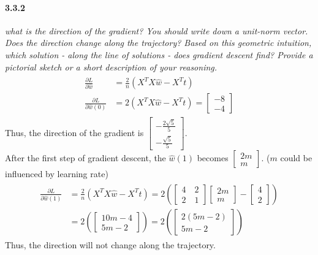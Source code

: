 \documentclass{myhw}
\begin{document}
\begin{homeworkProblem}
\begin{homeworkSection}
\paragraph{3.3.2} \emph{what is the direction of the gradient? You should write down a unit-norm vector. Does the direction change along the trajectory? Based on this geometric intuition, which solution - along the line of solutions - does gradient descent find? Provide a pictorial sketch or a short description of your reasoning. } 
\begin{gather*}
\begin{aligned}
\frac{\partial L}{\partial \hat{w}} &= \frac{2}{n} (X^TX\hat{w} - X^Tt) \\
\frac{\partial L}{\partial \hat{w}(0)} &= 2 (X^TX\hat{w} - X^Tt) = \begin{bmatrix} -8 \\ -4 \end{bmatrix}
\end{aligned}
\end{gather*}
Thus, the direction of the gradient is 
$\begin{bmatrix} -\frac{2\sqrt{5}}{5} \\ -\frac{\sqrt{5}}{5} \end{bmatrix}$. \\ 
After the first step of gradient descent, the $\hat{w}(1)$ becomes $\begin{bmatrix} 2m \\ m \end{bmatrix}$. 
($m$ could be influenced by learning rate)
\begin{gather*}
\begin{aligned}
\frac{\partial L}{\partial \hat{w}(1)} &= \frac{2}{n} (X^TX\hat{w} - X^Tt) = 2 (\begin{bmatrix} 4 \quad 2 \\ 2 \quad 1 \end{bmatrix} \begin{bmatrix} 2m \\ m \end{bmatrix} - \begin{bmatrix} 4 \\ 2 \end{bmatrix} ) \\
&= 2 ( \begin{bmatrix} 10m-4 \\ 5m-2 \end{bmatrix} ) = 2 ( \begin{bmatrix} 2(5m-2) \\ 5m-2 \end{bmatrix} )
\end{aligned}
\end{gather*}
Thus, the direction will not change along the trajectory. 


\end{homeworkSection}
\end{homeworkProblem}
\end{document}
